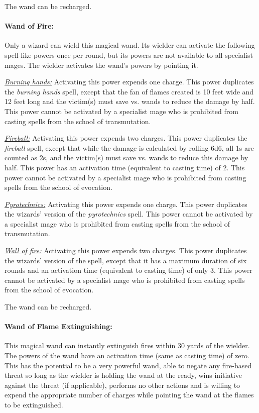 \begin{multicols}{2}
The wand can be recharged.

\paragraph{Wand of Fire:} Only a wizard can wield this magical wand.  Its wielder can activate the following spell-like powers once per round, but its powers are not available to all specialist mages.  The wielder activates the wand's powers by pointing it.

\underline{\textit{Burning hands:}} Activating this power expends one charge.  This power duplicates the \textit{burning hands} spell, except that the fan of flames created is 10 feet wide and 12 feet long and the victim(s) must save vs. wands to reduce the damage by half.  This power cannot be activated by a specialist mage who is prohibited from casting spells from the school of transmutation.

\underline{\textit{Fireball:}} Activating this power expends two charges.  This power duplicates the \textit{fireball} spell, except that while the damage is calculated by rolling 6d6, all 1s are counted as 2s, and the victim(s) must save vs. wands to reduce this damage by half.  This power has an activation time (equivalent to casting time) of 2.  This power cannot be activated by a specialist mage who is prohibited from casting spells from the school of evocation.

\underline{\textit{Pyrotechnics:}} Activating this power expends one charge.  This power duplicates the wizards' version of the \textit{pyrotechnics} spell.  This power cannot be activated by a specialist mage who is prohibited from casting spells from the school of transmutation.

\underline{\textit{Wall of fire:}} Activating this power expends two charges.  This power duplicates the wizards' version of the spell, except that it has a maximum duration of six rounds and an activation time (equivalent to casting time) of only 3.  This power cannot be activated by a specialist mage who is prohibited from casting spells from the school of evocation.

The wand can be recharged.

\paragraph{Wand of Flame Extinguishing:} This magical wand can instantly extinguish fires within 30 yards of the wielder.  The powers of the wand have an activation time (same as casting time) of zero.  This has the potential to be a very powerful wand, able to negate any fire-based threat so long as the wielder is holding the wand at the ready, wins initiative against the threat (if applicable), performs no other actions and is willing to expend the appropriate number of charges while pointing the wand at the flames to be extinguished. 


\end{multicols}
